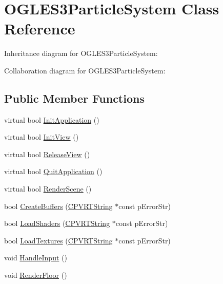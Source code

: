 \hypertarget{class_o_g_l_e_s3_particle_system}{\section{O\+G\+L\+E\+S3\+Particle\+System Class Reference}
\label{class_o_g_l_e_s3_particle_system}
}


Inheritance diagram for O\+G\+L\+E\+S3\+Particle\+System\+:


Collaboration diagram for O\+G\+L\+E\+S3\+Particle\+System\+:
\subsection*{Public Member Functions}
\begin{DoxyCompactItemize}
\item 
virtual bool \hyperlink{class_o_g_l_e_s3_particle_system_abb8266b7d160730a467ee94585db4136}{Init\+Application} ()
\item 
virtual bool \hyperlink{class_o_g_l_e_s3_particle_system_a4fefc128c2cc672d3b51fe1028a9b7de}{Init\+View} ()
\item 
virtual bool \hyperlink{class_o_g_l_e_s3_particle_system_a5a613f355ddab9ad14147f4da7cf30e0}{Release\+View} ()
\item 
virtual bool \hyperlink{class_o_g_l_e_s3_particle_system_a9ce9c509e76147be6d87d5adb81e3529}{Quit\+Application} ()
\item 
virtual bool \hyperlink{class_o_g_l_e_s3_particle_system_a4d0c7f4a55fa75fd6348c6ceea906751}{Render\+Scene} ()
\item 
bool \hyperlink{class_o_g_l_e_s3_particle_system_adc255c2929ac8d8da8f95b31b554ab60}{Create\+Buffers} (\hyperlink{class_c_p_v_r_t_string}{C\+P\+V\+R\+T\+String} $\ast$const p\+Error\+Str)
\item 
bool \hyperlink{class_o_g_l_e_s3_particle_system_ae0fa5d63d2377f8da6ec3a4957fd9b5d}{Load\+Shaders} (\hyperlink{class_c_p_v_r_t_string}{C\+P\+V\+R\+T\+String} $\ast$const p\+Error\+Str)
\item 
bool \hyperlink{class_o_g_l_e_s3_particle_system_a5b23e62839249f28d890a0681d5226af}{Load\+Textures} (\hyperlink{class_c_p_v_r_t_string}{C\+P\+V\+R\+T\+String} $\ast$const p\+Error\+Str)
\item 
void \hyperlink{class_o_g_l_e_s3_particle_system_acca58a1fa83f217c582389ffe32ec8f4}{Handle\+Input} ()
\item 
void \hyperlink{class_o_g_l_e_s3_particle_system_ada25038a6c2b9ac2f5afa92fa87aaced}{Render\+Floor} ()

\end{DoxyCompactItemize}
